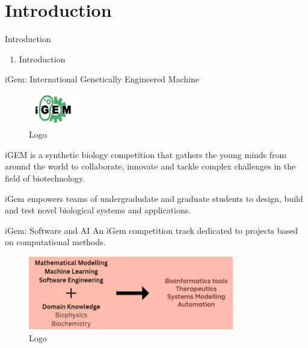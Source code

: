 \section*{Introduction}

\begin{frame}{Introduction}
    \begin{enumerate}
        \item Introduction
    \end{enumerate}
\end{frame}

\begin{frame}{iGem: International Genetically Engineered Machine}
    \begin{figure}
        \centering
        \includegraphics[width=0.2\textwidth]{images/igem.png}
        \caption{Logo}
        \label{fig:my_label}
    \end{figure}
    iGEM is a synthetic biology competition that gathers the young minds from around the world to collaborate, innovate and tackle complex challenges in the field of biotechnology.
    
    \bigskip

    iGem empowers teams of undergradudate and graduate students to design, build and test novel biological systems and applications.
    
\end{frame}

\begin{frame}{iGem: Software and AI}
    An iGem competition track dedicated to projects based on computational methods.
    \begin{figure}
        \centering
        \includegraphics[width=0.8\textwidth]{images/iGemSAI.png}
        \caption{Logo}
        \label{fig:my_label}
    \end{figure}
\end{frame}

